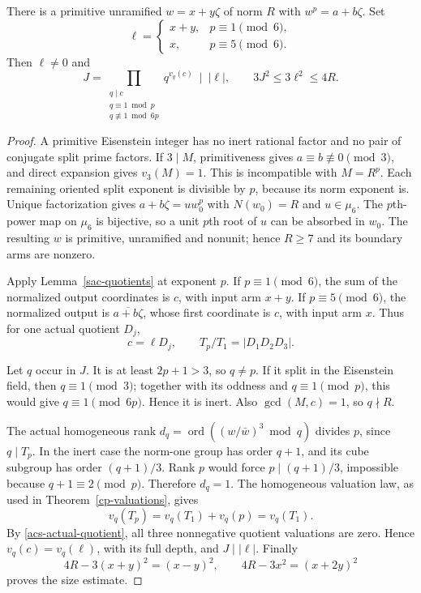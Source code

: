 \begin{lemma}
\label{acs-input-arm}
There is a primitive unramified $w=x+y\zeta$ of norm $R$ with
$w^p=a+b\zeta$. Set
\[
 \ell=\begin{cases}x+y,&p\equiv1\pmod6,\\x,&p\equiv5\pmod6.
 \end{cases}
\]
Then $\ell\ne0$ and
\begin{equation}\label{acs-extra-part}
 J=\prod_{\substack{q\mid c\\q\equiv1\bmod p\\q\not\equiv1\bmod6p}}
       q^{v_q(c)}\ \mid\ |\ell|,
 \qquad 3J^2\le3\ell^2\le4R.
\end{equation}
\end{lemma}
\begin{proof}
A primitive Eisenstein integer has no inert rational factor and no pair
of conjugate split prime factors. If $3\mid M$, primitiveness gives
$a\equiv b\not\equiv0\pmod3$, and direct expansion gives $v_3(M)=1$.
This is incompatible with $M=R^p$. Each remaining oriented split
exponent is divisible by $p$, because its norm exponent is. Unique
factorization gives $a+b\zeta=u w_0^p$ with $N(w_0)=R$ and
$u\in\mu_6$. The $p$th-power map on $\mu_6$ is bijective, so a unit
$p$th root of $u$ can be absorbed in $w_0$. The resulting $w$ is
primitive, unramified and nonunit; hence $R\ge7$ and its boundary
arms are nonzero.

Apply Lemma~\ref{sac-quotients} at exponent $p$. If $p\equiv1\pmod6$,
the sum of the normalized output coordinates is $c$, with input arm
$x+y$. If $p\equiv5\pmod6$, the normalized output is
$\overline{a+b\zeta}$, whose first coordinate is $c$, with input arm
$x$. Thus for one actual quotient $D_j$,
\begin{equation}\label{acs-actual-quotient}
 c=\ell D_j,\qquad T_p/T_1=|D_1D_2D_3|.
\end{equation}

Let $q$ occur in $J$. It is at least $2p+1>3$, so $q\ne p$.
If it split in the Eisenstein field, then $q\equiv1\pmod3$;
together with its oddness and $q\equiv1\pmod p$, this would give
$q\equiv1\pmod{6p}$. Hence it is inert. Also
$\gcd(M,c)=1$, so $q\nmid R$.

The actual homogeneous rank
$d_q=\operatorname{ord}((w/\bar w)^3\bmod q)$ divides $p$, since
$q\mid T_p$. In the inert case the norm-one group has order $q+1$,
and its cube subgroup has order $(q+1)/3$. Rank $p$ would force
$p\mid(q+1)/3$, impossible because $q+1\equiv2\pmod p$.
Therefore $d_q=1$. The homogeneous valuation law, as used in
Theorem~\ref{cp-valuations}, gives
\[
 v_q(T_p)=v_q(T_1)+v_q(p)=v_q(T_1).
\]
By \eqref{acs-actual-quotient}, all three nonnegative quotient
valuations are zero. Hence $v_q(c)=v_q(\ell)$, with its full depth,
and $J\mid|\ell|$. Finally
\[
 4R-3(x+y)^2=(x-y)^2,\qquad
 4R-3x^2=(x+2y)^2
\]
proves the size estimate.
\end{proof}

